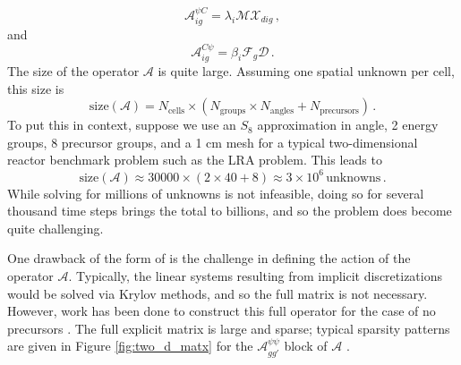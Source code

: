 \begin{equation}
 \mathcal{A}^{\psi C}_{ig} = \lambda_i \mathcal{M} \mathcal{X}_{dig} \, ,
\end{equation}
and
\begin{equation}
 \mathcal{A}^{C \psi}_{ig} = \beta_i \mathcal{F}_{g} \mathcal{D} \, .
\end{equation}
The size of the operator $\mathcal{A}$ is quite large.  Assuming
one spatial unknown per cell, this size is
\begin{equation}
 \text{size}(\mathcal{A}) = N_{\text{cells}} \times \left ( N_\text{groups} \times N_{\text{angles}} + N_{\text{precursors}} \right ) \, .
\end{equation}
To put this in context, suppose we use an $S_8$ approximation in angle,  
2 energy groups, 8 precursor groups, and a 1 cm mesh for a typical
two-dimensional reactor benchmark problem such as the LRA problem.  
This leads to
\begin{equation}
 \text{size}(\mathcal{A}) \approx 30000 \times \left ( 2 \times 40 + 8 \right )  \approx 3\times 10^6 \, \text{unknowns} \, .
\end{equation}
While solving for millions of unknowns is not infeasible, doing
so for several thousand time steps brings the total to 
billions, and so the problem does become quite challenging.

One drawback of the form of  is the 
challenge in defining the action of the operator $\mathcal{A}$.
Typically, the linear systems resulting from implicit 
discretizations would be solved via Krylov methods, and so
the full matrix is not necessary.  However, work has been done
to construct this full operator for the case of no 
precursors \cite{swesty2006std}.  The full explicit 
matrix is large and sparse; typical sparsity patterns are given
in Figure \ref{fig:two_d_matx} for the $\mathcal{A}^{\psi \psi}_{gg'}$
block of $\mathcal{A}$ \cite{roberts2010dsd}.


